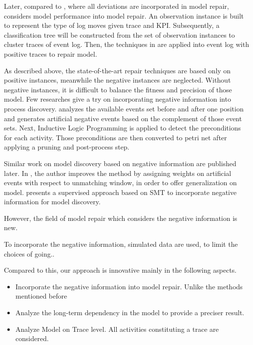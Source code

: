 \documentclass[]{article}
\begin{document}
Later, compared to \cite{fahland2012repairing, fahland2015model}, where all deviations are incorporated in model repair, \cite{dees2017enhancing} considers model performance into model repair. An observation instance is built to represent the type of log moves given trace and  KPI. Subsequently, a classification tree will be constructed from the set of observation instances to cluster traces of event log. Then, the techniques in \cite{fahland2015model} are applied into event log with positive traces to repair model. 



As described above, the state-of-the-art repair techniques are based only on positive instances, meanwhile the negative instances are neglected. Without negative instances, it is difficult to balance the fitness and precision of those model. Few researches give a try on incorporating negative information into process discovery. \cite{goedertier2009robust}  analyzes the available events set before and after one position and generates artificial negative events based on the complement of those event sets. Next, Inductive Logic Programming is applied to detect the preconditions for each activity. Those preconditions are then converted to petri net after applying a pruning and post-process step. 

Similar work on model discovery based on negative information are published later. In \cite{vanden2014determining}, the author improves the method by assigning weights on artificial events with respect to unmatching window, in order to offer generalization on model. \cite{ponce2016incorporating} presents a supervised approach based on SMT to incorporate negative information for model discovery. 

However, the field of model repair which considers the negative information is new. 

To incorporate the negative information, simulated data are used, to limit the choices of going..

Compared to this, our approach is innovative mainly in the following aspects. 
\begin{itemize}
	\item Incorporate the negative information into model repair. Unlike the methods mentioned before
	\item Analyze the long-term dependency in the model to provide a preciser result. 
	\item Analyze Model on Trace level. All activities constituting a trace are considered. 
\end{itemize}
\end{document}
